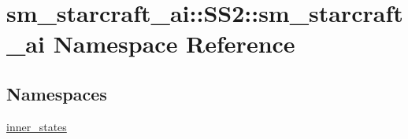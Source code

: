 \hypertarget{namespacesm__starcraft__ai_1_1SS2_1_1sm__starcraft__ai}{}\section{sm\+\_\+starcraft\+\_\+ai\+:\+:S\+S2\+:\+:sm\+\_\+starcraft\+\_\+ai Namespace Reference}
\label{namespacesm__starcraft__ai_1_1SS2_1_1sm__starcraft__ai}
\subsection*{Namespaces}
\begin{DoxyCompactItemize}
\item 
 \hyperlink{namespacesm__starcraft__ai_1_1SS2_1_1sm__starcraft__ai_1_1inner__states}{inner\+\_\+states}
\end{DoxyCompactItemize}
